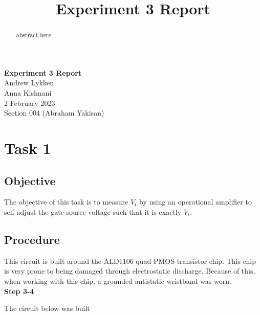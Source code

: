\documentclass[notitlepage, 12pt]{report}  %
\title{Experiment 3 Report}
\begin{document}
\graphicspath{{./images/}}

\begin{center}
\large \textbf{Experiment 3 Report} \\ %
\small 
Andrew Lykken\\
Anna Kishnani\\
2 February 2023\\
Section 004 (Abraham Yakisan)\\

\end{center}

\vspace{4in}


\begin{abstract}
abstract here 
\end{abstract}

\newpage

\section*{Task 1} %


\subsection*{Objective}

\indent\indent The objective of this task is to measure $V_{t}$ by using an operational amplifier to self-adjust 
the gate-source voltage such that it is exactly $V_{t}$. \\

\subsection*{Procedure}

\indent\indent This circuit is built around the ALD1106 quad PMOS transistor chip. This chip is very prone to being
damaged through electrostatic discharge. Because of this, when working with this chip, a grounded antistatic 
wristband was worn.\\

\textbf{Step 3-4}

The circuit below was built
\end{document}
